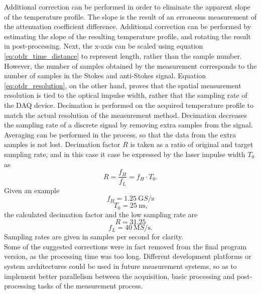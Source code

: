 \documentclass{standalone}
\begin{document}
Additional correction can be performed in order to eliminate the apparent slope of the temperature profile. The slope is the result of an erroneous measurement of the attenuation coefficient difference. Additional correction can be performed by estimating the slope of the resulting temperature profile, and rotating the result in post-processing. Next, the x-axis can be scaled using equation \ref{eq:otdr_time_distance} to represent length, rather than the sample number. However, the number of samples obtained by the measurement corresponds to the number of samples in the Stokes and anti-Stokes signal. Equation \ref{eq:otdr_resolution}, on the other hand, proves that the spatial measurement resolution is tied to the optical impulse width, rather that the sampling rate of the DAQ device. Decimation is performed on the acquired temperature profile to match the actual resolution of the measurement method. Decimation decreases the sampling rate of a discrete signal by removing extra samples from the signal. Averaging can be performed in the process, so that the data from the extra samples is not lost. Decimation factor $R$ is taken as a ratio of original and target sampling rate, and in this case it case be expressed by the laser impulse width $T_0$ as
\begin{equation}
R = \frac{f_H}{f_L} = f_H \cdot T_0 \textrm{.}
\end{equation}
Given an example
\begin{equation}
f_H = \SI{1.25}{\giga S / \second}
\end{equation}
\begin{equation}
T_0 = \SI{25}{\nano \second} \textrm{,}
\end{equation}
the calculated decimation factor and the low sampling rate are
\begin{equation}
R = 31.25
\end{equation}
\begin{equation}
f_L = \SI{40}{\mega S / \second} \textrm{.}
\end{equation}
Sampling rates are given in samples per second for clarity. \\

Some of the suggested corrections were in fact removed from the final program version, as the processing time was too long. Different development platforms or system architectures could be used in future measurement systems, so as to implement better parallelism between the acquisition, basic processing and post-processing tasks of the measurement process.
\end{document}

